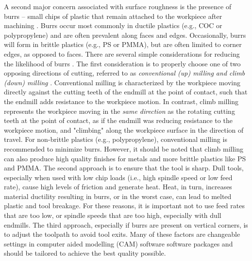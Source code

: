 A second major concern associated with surface roughness is the presence of burrs -- small chips of plastic that remain attached to the workpiece after machining \cite{Lee2005}. Burrs occur most commonly in ductile plastics (e.g., COC or polypropylene) and are often prevalent along faces and edges. Occasionally, burrs will form in brittle plastics (e.g., PS or PMMA), but are often limited to corner edges, as opposed to faces. There are several simple considerations for reducing the likelihood of burrs \cite{Dimov2004}. The first consideration is to properly choose one of two opposing directions of cutting, referred to as \textit{conventional (up) milling and climb (down) milling} \cite{Toh2004}. Conventional milling is characterized by the workpiece moving directly against the cutting teeth of the endmill at the point of contact, such that the endmill adds resistance to the workpiece motion. In contrast, climb milling represents the workpiece moving in the \textit{same direction} as the rotating cutting teeth at the point of contact, as if the endmill was reducing resistance to the workpiece motion, and "climbing" along the workpiece surface in the direction of travel. For non-brittle plastics (e.g., polypropylene), conventional milling is recommended to minimize burrs. However, it should be noted that climb milling can also produce high quality finishes for metals \cite{Bernardos2002} and more brittle plastics like PS and PMMA. The second approach is to ensure that the tool is sharp. Dull tools, especially when used with low chip loads (i.e., high spindle speed or low feed rate), cause high levels of friction and generate heat. Heat, in turn, increases material ductility resulting in burrs, or in the worst case, can lead to melted plastic and tool breakage. For these reasons, it is important not to use feed rates that are too low, or spindle speeds that are too high, especially with dull endmills. The third approach, especially if burrs are present on vertical corners, is to adjust the toolpath to avoid tool exits. Many of these factors are changeable settings in computer aided modelling (CAM) software software packages and should be tailored to achieve the best quality possible.
